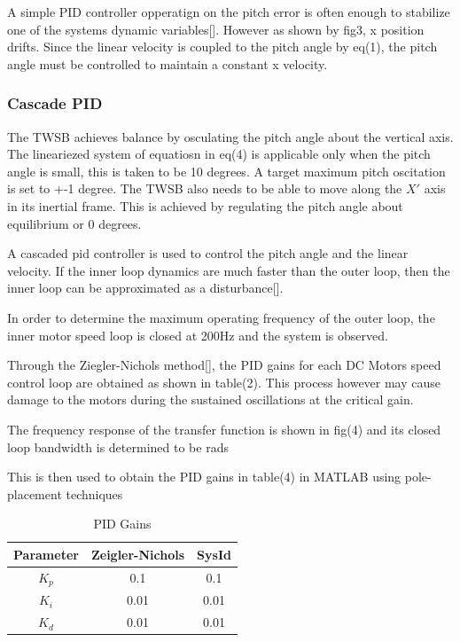         A simple PID controller opperatign on the pitch error is often enough to stabilize one of the systems dynamic variables[].
        However as shown by fig3, x position drifts. Since the linear velocity is coupled to the
        pitch angle by eq(1), the pitch angle must be controlled to maintain a constant x velocity. 

        \subsubsection{Cascade PID}

        The TWSB achieves balance by osculating the pitch angle about the vertical axis. 
        The lineariezed system of equatiosn in eq(4) is applicable 
        only when the pitch angle is small, this is taken to be 10 degrees. 
        A target maximum pitch oscitation is set to +-1 degree. 
        The TWSB also needs to be able to move along the $X'$ axis in its inertial frame.
        This is achieved by regulating the pitch angle about equilibrium or 0 degrees.

        A cascaded pid controller is used to control the pitch angle and the linear velocity. 
        If the inner loop dynamics are much faster than the outer loop, 
        then the inner loop can be approximated as a disturbance[].



        In order to determine the maximum operating frequency of the outer loop, 
        the inner motor speed loop is closed at 200Hz and the system is observed.
        
        Through the Ziegler-Nichols method[], the PID gains for each DC Motors speed control loop 
        are obtained as shown in table(2). This process however may cause damage to the motors 
        during the sustained oscillations at the critical gain. 
       
        

        

        The frequency response of the transfer function is shown in fig(4) and its closed loop bandwidth is determined to be rads

        This is then used to obtain the PID gains in table(4) in MATLAB using pole-placement techniques
        \begin{table}[H]
            \centering
            \begin{tabular}{|c|c|c|}
                \hline
                Parameter & Zeigler-Nichols & SysId \\
                \hline 
                $K_p$ & 0.1 & 0.1 \\
                $K_i$ & 0.01 & 0.01 \\
                $K_d$ & 0.01 & 0.01 \\
                \hline
            \end{tabular}
            \caption{PID Gains}
        \end{table}

